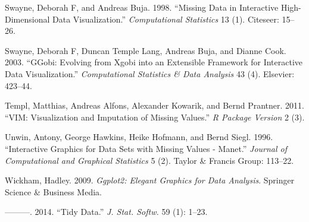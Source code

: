 \documentclass[]{article}
\begin{document}
\hypertarget{ref-Swayne1998}{}
Swayne, Deborah F, and Andreas Buja. 1998. ``Missing Data in Interactive
High-Dimensional Data Visualization.'' \emph{Computational Statistics}
13 (1). Citeseer: 15--26.

\hypertarget{ref-swayne2003ggobi}{}
Swayne, Deborah F, Duncan Temple Lang, Andreas Buja, and Dianne Cook.
2003. ``GGobi: Evolving from Xgobi into an Extensible Framework for
Interactive Data Visualization.'' \emph{Computational Statistics \& Data
Analysis} 43 (4). Elsevier: 423--44.

\hypertarget{ref-vim}{}
Templ, Matthias, Andreas Alfons, Alexander Kowarik, and Bernd Prantner.
2011. ``VIM: Visualization and Imputation of Missing Values.'' \emph{R
Package Version} 2 (3).

\hypertarget{ref-Unwin1996}{}
Unwin, Antony, George Hawkins, Heike Hofmann, and Bernd Siegl. 1996.
``Interactive Graphics for Data Sets with Missing Values - Manet.''
\emph{Journal of Computational and Graphical Statistics} 5 (2). Taylor
\& Francis Group: 113--22.

\hypertarget{ref-wickham2009ggplot2}{}
Wickham, Hadley. 2009. \emph{Ggplot2: Elegant Graphics for Data
Analysis}. Springer Science \& Business Media.

\hypertarget{ref-Wickham2014}{}
---------. 2014. ``Tidy Data.'' \emph{J. Stat. Softw.} 59 (1): 1--23.
\end{document}
